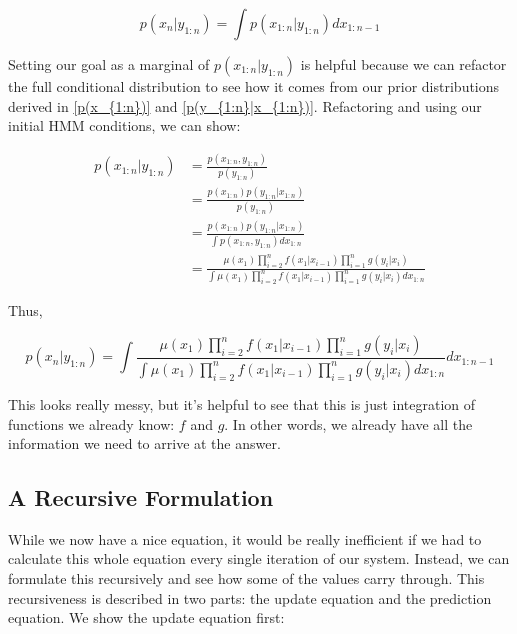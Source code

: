 \documentclass{article}
\begin{document}
\begin{equation}
p(x_{n}|y_{1:n}) = \int p(x_{1:n}|y_{1:n}) dx_{1:n-1}
\end{equation}

Setting our goal as a marginal of $p(x_{1:n}|y_{1:n})$ is helpful because we can refactor the full conditional distribution to see how it comes from our prior distributions derived in \eqref{p(x_{1:n})} and \eqref{p(y_{1:n}|x_{1:n})}. Refactoring and using our initial HMM conditions, we can show:

\begin{equation}
\begin{split}
p(x_{1:n}|y_{1:n}) &= \frac{p(x_{1:n},y_{1:n})}{p(y_{1:n})}\\
&= \frac{p(x_{1:n}) p(y_{1:n}|x_{1:n})}{p(y_{1:n})}\\
&= \frac{p(x_{1:n}) p(y_{1:n}|x_{1:n})}{\int p(x_{1:n},y_{1:n}) dx_{1:n}}\\
&= \frac{\mu(x_1)\prod_{i=2}^{n} f(x_1|x_{i-1})\prod_{i=1}^{n} g(y_i|x_i)}{\int \mu(x_1)\prod_{i=2}^{n} f(x_1|x_{i-1})\prod_{i=1}^{n} g(y_i|x_i) dx_{1:n}}
\end{split}
\end{equation}

Thus,

\begin{equation}
p(x_n|y_{1:n}) = \int \frac{\mu(x_1)\prod_{i=2}^{n} f(x_1|x_{i-1})\prod_{i=1}^{n} g(y_i|x_i)}{\int \mu(x_1)\prod_{i=2}^{n} f(x_1|x_{i-1})\prod_{i=1}^{n} g(y_i|x_i) dx_{1:n}} dx_{1:n-1}
\end{equation}

This looks really messy, but it's helpful to see that this is just integration of functions we already know: $f$ and $g$. In other words, we already have all the information we need to arrive at the answer.

\subsection{A Recursive Formulation}
While we now have a nice equation, it would be really inefficient if we had to calculate this whole equation every single iteration of our system. Instead, we can formulate this recursively and see how some of the values carry through. This recursiveness is described in two parts: the update equation and the prediction equation. We show the update equation first:
\end{document}
